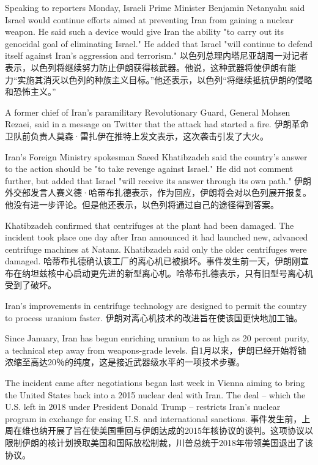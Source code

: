 Speaking to reporters Monday, Israeli Prime Minister Benjamin Netanyahu said Israel would continue efforts aimed at preventing Iran from gaining a nuclear weapon. He said such a device would give Iran the ability "to carry out its genocidal goal of eliminating Israel." He added that Israel "will continue to defend itself against Iran's aggression and terrorism."
以色列总理内塔尼亚胡周一对记者表示，以色列将继续努力防止伊朗获得核武器。他说，这种武器将使伊朗有能力“实施其消灭以色列的种族主义目标。”他还表示，以色列“将继续抵抗伊朗的侵略和恐怖主义。”

A former chief of Iran's paramilitary Revolutionary Guard, General Mohsen Rezaei, said in a message on Twitter that the attack had started a fire.
伊朗革命卫队前负责人莫森·雷扎伊在推特上发文表示，这次袭击引发了大火。

Iran's Foreign Ministry spokesman Saeed Khatibzadeh said the country's answer to the action should be "to take revenge against Israel." He did not comment further, but added that Israel "will receive its answer through its own path."
伊朗外交部发言人赛义德·哈蒂布扎德表示，作为回应，伊朗将会对以色列展开报复。他没有进一步评论。但是他还表示，以色列将通过自己的途径得到答案。

Khatibzadeh confirmed that centrifuges at the plant had been damaged. The incident took place one day after Iran announced it had launched new, advanced centrifuge machines at Natanz. Khatibzadeh said only the older centrifuges were damaged.
哈蒂布扎德确认该工厂的离心机已被损坏。事件发生前一天，伊朗刚宣布在纳坦兹核中心启动更先进的新型离心机。哈蒂布扎德表示，只有旧型号离心机受到了破坏。

Iran's improvements in centrifuge technology are designed to permit the country to process uranium faster.
伊朗对离心机技术的改进旨在使该国更快地加工铀。

Since January, Iran has begun enriching uranium to as high as 20 percent purity, a technical step away from weapons-grade levels.
自1月以来，伊朗已经开始将铀浓缩至高达20％的纯度，这是接近武器级水平的一项技术步骤。

The incident came after negotiations began last week in Vienna aiming to bring the United States back into a 2015 nuclear deal with Iran. The deal -- which the U.S. left in 2018 under President Donald Trump -- restricts Iran's nuclear program in exchange for easing U.S. and international sanctions.
事件发生前，上周在维也纳开展了旨在使美国重回与伊朗达成的2015年核协议的谈判。这项协议以限制伊朗的核计划换取美国和国际放松制裁，川普总统于2018年带领美国退出了该协议。

